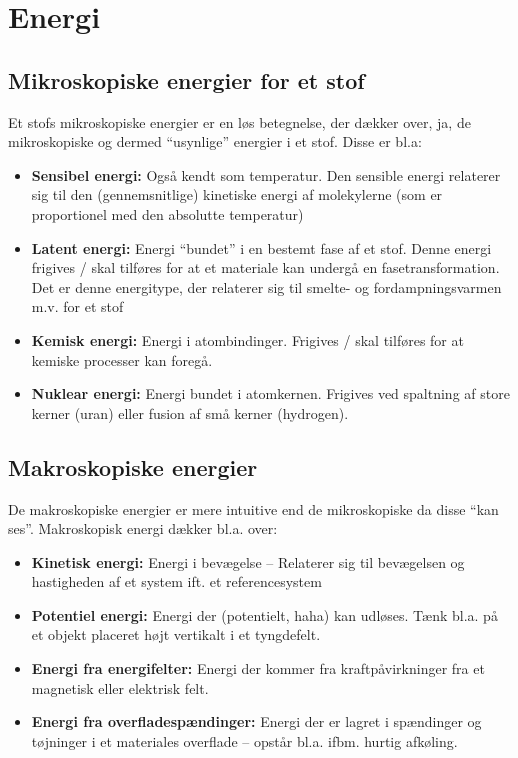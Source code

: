 
\section{Energi}

\subsection{Mikroskopiske energier for et stof}
Et stofs mikroskopiske energier er en løs betegnelse, der dækker over, ja, de mikroskopiske og dermed ``usynlige'' energier i et stof. Disse er bl.a:
\begin{itemize}
  \item \textbf{Sensibel energi:} Også kendt som temperatur. Den sensible energi relaterer sig til den (gennemsnitlige) kinetiske energi af molekylerne (som er proportionel med den absolutte temperatur)
  \item \textbf{Latent energi:} Energi ``bundet'' i en bestemt fase af et stof. Denne energi frigives / skal tilføres for at et materiale kan undergå en fasetransformation. Det er denne energitype, der relaterer sig til smelte- og fordampningsvarmen m.v. for et stof
  \item \textbf{Kemisk energi:} Energi i atombindinger. Frigives / skal tilføres for at kemiske processer kan foregå.
  \item \textbf{Nuklear energi:} Energi bundet i atomkernen. Frigives ved spaltning af store kerner (uran) eller fusion af små kerner (hydrogen). 
\end{itemize}

\subsection{Makroskopiske energier}
De makroskopiske energier er mere intuitive end de mikroskopiske da disse ``kan ses''. Makroskopisk energi dækker bl.a. over:
\begin{itemize}
  \item \textbf{Kinetisk energi:} Energi i bevægelse -- Relaterer sig til bevægelsen og hastigheden af et system ift. et referencesystem
  \item \textbf{Potentiel energi:} Energi der (potentielt, haha) kan udløses. Tænk bl.a. på et objekt placeret højt vertikalt i et tyngdefelt.
  \item \textbf{Energi fra energifelter:} Energi der kommer fra kraftpåvirkninger fra et magnetisk eller elektrisk felt.
  \item \textbf{Energi fra overfladespændinger:} Energi der er lagret i spændinger og tøjninger i et materiales overflade -- opstår bl.a. ifbm. hurtig afkøling.
\end{itemize}

